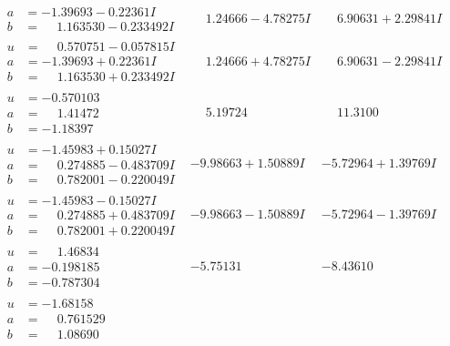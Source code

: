 \documentclass[1p]{elsarticle_modified}
\theoremstyle{definition}
\begin{document}
$$\begin{array}{c|c|c}
\begin{aligned}
a &= -1.39693 - 0.22361 I \\
b &= \phantom{-}1.163530 - 0.233492 I\end{aligned}
 & \phantom{-}1.24666 - 4.78275 I & \phantom{-}6.90631 + 2.29841 I \\ \hline\begin{aligned}
u &= \phantom{-}0.570751 - 0.057815 I \\
a &= -1.39693 + 0.22361 I \\
b &= \phantom{-}1.163530 + 0.233492 I\end{aligned}
 & \phantom{-}1.24666 + 4.78275 I & \phantom{-}6.90631 - 2.29841 I \\ \hline\begin{aligned}
u &= -0.570103\phantom{ +0.000000I} \\
a &= \phantom{-}1.41472\phantom{ +0.000000I} \\
b &= -1.18397\phantom{ +0.000000I}\end{aligned}
 & \phantom{-}5.19724\phantom{ +0.000000I} & \phantom{-}11.3100\phantom{ +0.000000I} \\ \hline\begin{aligned}
u &= -1.45983 + 0.15027 I \\
a &= \phantom{-}0.274885 - 0.483709 I \\
b &= \phantom{-}0.782001 - 0.220049 I\end{aligned}
 & -9.98663 + 1.50889 I & -5.72964 + 1.39769 I \\ \hline\begin{aligned}
u &= -1.45983 - 0.15027 I \\
a &= \phantom{-}0.274885 + 0.483709 I \\
b &= \phantom{-}0.782001 + 0.220049 I\end{aligned}
 & -9.98663 - 1.50889 I & -5.72964 - 1.39769 I \\ \hline\begin{aligned}
u &= \phantom{-}1.46834\phantom{ +0.000000I} \\
a &= -0.198185\phantom{ +0.000000I} \\
b &= -0.787304\phantom{ +0.000000I}\end{aligned}
 & -5.75131\phantom{ +0.000000I} & -8.43610\phantom{ +0.000000I} \\ \hline\begin{aligned}
u &= -1.68158\phantom{ +0.000000I} \\
a &= \phantom{-}0.761529\phantom{ +0.000000I} \\
b &= \phantom{-}1.08690\phantom{ +0.000000I}\end{aligned}

\end{array}$$
\end{document}
